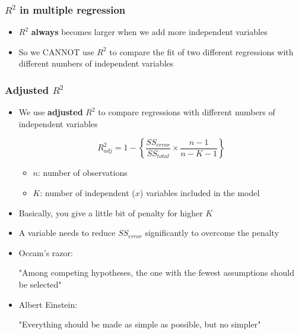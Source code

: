 \documentclass[10pt,article]{article}
\begin{document}
\subsubsection{\(R^2\) in multiple regression}
\label{sec:orgbbaf789}
\begin{itemize}
\item \(R^2\) \textbf{always} becomes larger when we add more
independent variables
\item So we CANNOT use \(R^2\) to compare the fit of two different regressions
with different numbers of independent variables
\end{itemize}
\subsubsection{Adjusted \(R^{2}\)}
\label{sec:org3a1c982}
\begin{itemize}
\item We use \textbf{adjusted} \(R^2\) to compare regressions with
different numbers of independent variables

\[  R^2_{adj} = 1 - \left\{ \dfrac{SS_{error}}{SS_{total}} \times
      \dfrac{n-1}{n-K-1} \right\} \]

\begin{itemize}
\item \(n\): number of observations
\item \(K\): number of independent (\(x\)) variables included in the model
\end{itemize}
\end{itemize}

\iffalse
\[  R^2_{adj} = 1 - \left\{ \dfrac{SS_{error}}{SS_{total}} \times
    \dfrac{n-1}{n-K-1} \right\} \]
\fi

\begin{itemize}
\item Basically, you give a little bit of penalty for higher \(K\)
\item A variable needs to reduce \(SS_{error}\) significantly to overcome the
penalty
\end{itemize}

\begin{itemize}
\item Occam's razor: 

"Among competing hypotheses, the one with the fewest assumptions should be selected"
\end{itemize}

\begin{itemize}
\item Albert Einstein:

"Everything should be made as simple as possible, but no simpler"
\end{itemize}
\end{document}
